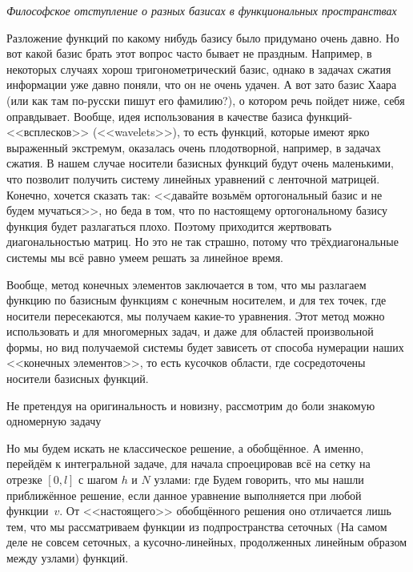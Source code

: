 \documentclass[a4paper]{article}
\begin{document}
\begin{petit}

\textsl{Философское отступление о разных базисах в функциональных
  пространствах}

Разложение функций по какому нибудь базису было придумано очень
давно. Но вот какой базис брать этот вопрос часто бывает не
праздным. Например, в некоторых случаях хорош тригонометрический
базис, однако в задачах сжатия информации уже давно поняли, что он не
очень удачен. А вот зато базис Хаара (или как там по-русски пишут его
фамилию?), о котором речь пойдет ниже, себя оправдывает. Вообще, идея
использования в качестве базиса функций-<<всплесков>> (<<wavelets>>),
то есть функций, которые имеют ярко выраженный экстремум, оказалась
очень плодотворной, например, в задачах сжатия.  В нашем случае
носители базисных функций будут очень маленькими, что позволит
получить систему линейных уравнений с ленточной матрицей. Конечно,
хочется сказать так: <<давайте возьмём ортогональный базис и не будем
мучаться>>, но беда в том, что по настоящему ортогональному базису
функция будет разлагаться плохо. Поэтому приходится жертвовать
диагональностью матриц. Но это не так страшно, потому что
трёхдиагональные системы мы всё равно умеем решать за линейное время.

Вообще, метод конечных элементов заключается в том, что мы разлагаем
функцию по базисным функциям с конечным носителем, и для тех точек,
где носители пересекаются, мы получаем какие-то уравнения. Этот метод
можно использовать и для многомерных задач, и даже для областей
произвольной формы, но вид получаемой системы будет зависеть от
способа нумерации наших <<конечных элементов>>, то есть кусочков
области, где сосредоточены носители базисных функций.
\end{petit}


Не претендуя на оригинальность и новизну, рассмотрим до боли знакомую
одномерную задачу 

Но мы будем искать не классическое решение, а обобщённое. А именно,
перейдём к интегральной задаче, для начала спроецировав всё на сетку
на отрезке $[0,l]$ с шагом $h$ и $N$ узлами:
 где
  Будем говорить, что мы нашли
приближённое решение, если данное уравнение выполняется при любой
функции~$v$.  От <<настоящего>> обобщённого решения оно отличается
лишь тем, что мы рассматриваем функции из подпространства сеточных (На
самом деле не совсем сеточных, а кусочно-линейных, продолженных
линейным образом между узлами) функций.
\end{document}
